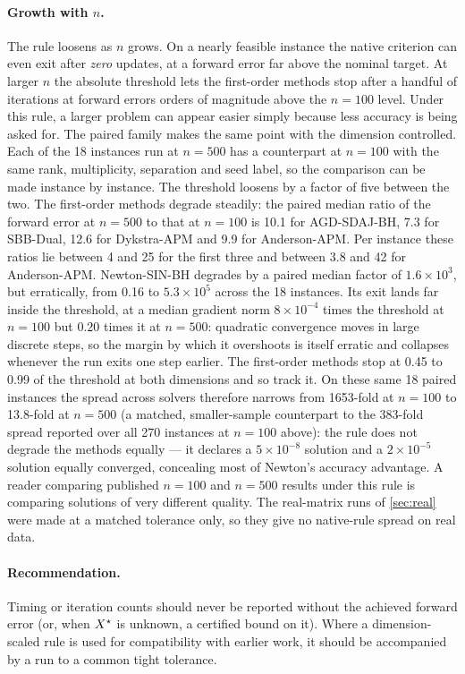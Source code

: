 \paragraph{Growth with $n$.}
The rule loosens as $n$ grows. On a nearly feasible instance the native
criterion can even exit after \emph{zero} updates, at a forward error far
above the nominal target. At larger $n$ the absolute threshold lets the
first-order methods stop after a handful of iterations at forward errors
orders of magnitude above the $n=100$ level. Under this rule, a larger
problem can appear easier
simply because less accuracy is being asked for.
The paired family makes the same point with the dimension controlled. Each of
the 18 instances run at $n=500$ has a counterpart at $n=100$ with the same
rank, multiplicity, separation and seed label, so the comparison can be made
instance by instance. The threshold loosens by a factor of five between the
two. The first-order methods degrade steadily: the paired median ratio of the
forward error at $n=500$ to that at $n=100$ is 10.1 for AGD-SDAJ-BH, 7.3 for
SBB-Dual, 12.6 for Dykstra-APM and 9.9 for Anderson-APM. Per instance these
ratios lie between 4 and 25 for the first three and between 3.8 and 42 for
Anderson-APM.
Newton-SIN-BH degrades by a paired median factor of $1.6\times10^{3}$, but
erratically, from 0.16 to $5.3\times10^{5}$ across the 18 instances. Its exit
lands far inside the threshold, at a median gradient norm $8\times10^{-4}$ times
the threshold at $n=100$ but $0.20$ times it at $n=500$: quadratic convergence
moves in large discrete steps, so the margin by which it overshoots is itself
erratic and collapses whenever the run exits one step earlier. The first-order
methods stop at 0.45 to 0.99 of the threshold at both dimensions and so track
it. On these same 18 paired instances the spread across solvers therefore
narrows from 1653-fold at $n=100$ to 13.8-fold at $n=500$ (a matched,
smaller-sample counterpart to the 383-fold spread reported over all 270
instances at $n=100$ above): the rule does not degrade the
methods equally --- it declares a $5\times10^{-8}$ solution and a
$2\times10^{-5}$ solution equally converged, concealing most of Newton's
accuracy advantage. A reader comparing published $n=100$ and $n=500$ results
under this rule is comparing solutions of very different quality.
The real-matrix runs of \cref{sec:real} were made at a matched tolerance
only, so they give no native-rule spread on real data.

\paragraph{Recommendation.}
Timing or iteration counts should never be reported without the achieved
forward error (or, when $X^\star$ is unknown, a certified bound on it). Where a
dimension-scaled rule is used for compatibility with earlier work, it should
be accompanied by a run to a common tight tolerance.
